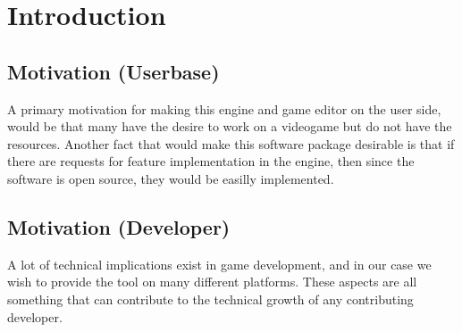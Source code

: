 \section{Introduction}


\subsection{Motivation (Userbase)} 

A primary motivation for making this engine and game editor on the user side,
would be that many have the desire to work on a videogame but do not have the
resources. Another fact that would make this software package desirable is that
if there are requests for feature implementation in the engine, then since the 
software is open source, they would be easilly implemented. 

\subsection{Motivation (Developer)}

A lot of technical implications exist in game development, and in our case we
wish to provide the tool on many different platforms. These aspects are all
something that can contribute to the technical growth of any contributing
developer.

